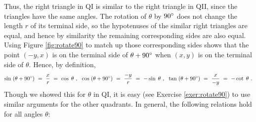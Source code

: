 Thus, the right triangle in QI is similar to the right triangle in QII, since the triangles have the
same angles. The rotation of $\theta$ by $90^\circ$ does not change the length $r$ of its terminal
side, so the hypotenuses of the similar right triangles are equal, and hence by similarity the
remaining corresponding sides are also equal. Using Figure \ref{fig:rotate90} to match up those
corresponding sides shows that the point $(-y,x)$ is on the terminal side of $\theta + 90^\circ$
when $(x,y)$ is on the terminal side of $\theta$. Hence, by definition,
\begin{displaymath}
 \sin\;(\theta + 90^\circ) ~ = ~ \frac{x}{r} ~=~ \cos\;\theta ~,~~
 \cos\;(\theta + 90^\circ) ~ = ~ \frac{-y}{r} ~=~ -\sin\;\theta ~,~~
 \tan\;(\theta + 90^\circ) ~ = ~ \frac{x}{-y} ~=~ -\cot\;\theta ~.
\end{displaymath}
Though we showed this for $\theta$ in QI, it is easy (see Exercise \ref{exer:rotate90}) to use
similar arguments for the other quadrants. In general, the following relations hold for all angles
$\theta$:

